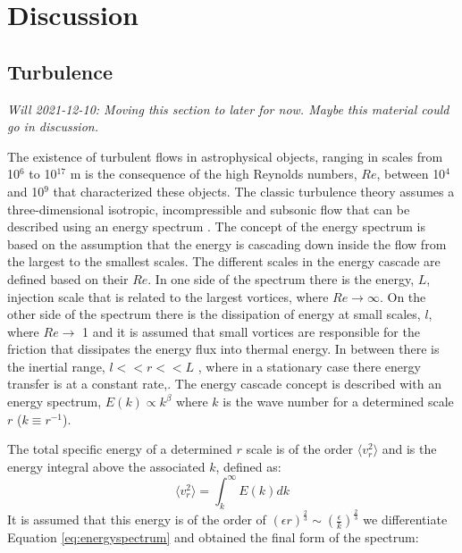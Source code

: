 \documentclass[fleqn,usenatbib, useAMS, a4paper]{mnras}
\begin{document}



\section{Discussion}\label{sec:discussion}

\subsection{Turbulence}

\textit{Will 2021-12-10: Moving this section to later for now. Maybe
  this material could go in discussion.}

The existence of turbulent flows in astrophysical objects, ranging in scales from 10$^{6}$ to 10$^{17}$ m \citep{2010ApJ...710..853C} is the consequence of the high Reynolds numbers, $Re$, between 10$^{4}$ and 10$^{9}$ \citep{1949ApJ...110..329C,lagrois2011} that characterized these objects.
The classic turbulence theory assumes a three-dimensional isotropic, incompressible and subsonic flow that can be described using an energy spectrum \citep{kolm1}.
The concept of the energy spectrum is based on the assumption that the energy is cascading down inside the flow from the largest to the smallest scales.
The different scales in the energy cascade are defined based on their $Re$.
In one side of the spectrum there is the energy, \(L\), injection scale that is related to the largest vortices, where $ Re \rightarrow \infty$.
On the other side of the spectrum there is the dissipation of energy at small scales, \(l\), where $Re \rightarrow$ 1 and it is assumed that small vortices are responsible for the friction that dissipates the energy flux into thermal energy.
In between there is the inertial range, \(l  << r << L\) , where in a stationary case there energy transfer is at a constant rate,.
The energy cascade concept is described with an energy spectrum, $E(k) \propto k^{\beta}$ where $k$ is the wave number for a determined scale $r$ ($k \equiv r^{-1}$).

The total specific energy of a determined $r$ scale is of the order $\langle v_{r}^{2} \rangle$ and is the energy integral above the associated $k$, defined as:
\begin{equation}\label{eq:energyspectrum}
 \langle v_{r}^{2} \rangle = \int_{k}^{\infty} E(k)dk
\end{equation}
%
It is assumed that this energy is of the order of $(\epsilon r)^{\frac{2}{3}} \sim (\frac{\epsilon}{k})^{\frac{2}{3}}$ we differentiate Equation \ref{eq:energyspectrum} and obtained the final form of the spectrum:
\end{document}
